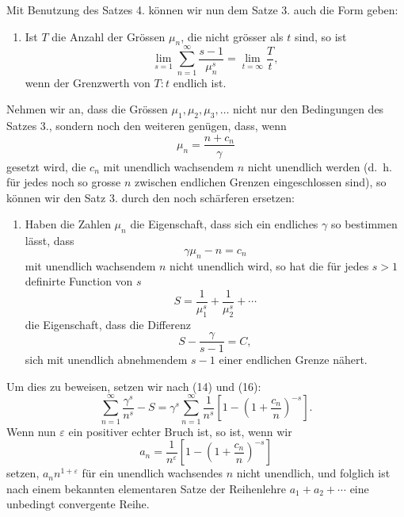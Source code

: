 \documentclass[11pt]{article}
\begin{document}
Mit Benutzung des Satzes 4. können wir nun dem Satze 3. auch die Form geben:

\begin{enumerate}[label=\textbf{\arabic*.},leftmargin=2.2em,start=5]
\item Ist $T$ die Anzahl der Grössen $\mu_n$, die nicht grösser als $t$ sind, so ist
\begin{equation}
\lim_{s=1}\sum_{n=1}^{\infty}\frac{s-1}{\mu_n^s}=\lim_{t=\infty}\frac{T}{t},
\tag{13}
\end{equation}
wenn der Grenzwerth von $T:t$ endlich ist.
\end{enumerate}

Nehmen wir an, dass die Grössen $\mu_1,\mu_2,\mu_3,\ldots$ nicht nur den Bedingungen des Satzes 3., sondern noch den weiteren genügen, dass, wenn
\begin{equation}
\mu_n=\frac{n+c_n}{\gamma}
\tag{14}
\end{equation}
gesetzt wird, die $c_n$ mit unendlich wachsendem $n$ nicht unendlich werden (d.\ h. für jedes noch so grosse $n$ zwischen endlichen Grenzen eingeschlossen sind), so können wir den Satz 3. durch den noch schärferen ersetzen:

\begin{enumerate}[label=\textbf{\arabic*.},leftmargin=2.2em,start=6]
\item Haben die Zahlen $\mu_n$ die Eigenschaft, dass sich ein endliches $\gamma$ so bestimmen lässt, dass
\begin{equation}
\gamma\mu_n-n=c_n
\tag{15}
\end{equation}
mit unendlich wachsendem $n$ nicht unendlich wird, so hat die für jedes $s>1$ definirte Function von $s$
\begin{equation}
S=\frac1{\mu_1^s}+\frac1{\mu_2^s}+\cdots
\tag{16}
\end{equation}
die Eigenschaft, dass die Differenz
\begin{equation}
S-\frac{\gamma}{s-1}=C,
\tag{17}
\end{equation}
sich mit unendlich abnehmendem $s-1$ einer endlichen Grenze nähert.
\end{enumerate}

Um dies zu beweisen, setzen wir nach (14) und (16):
\begin{equation}
\sum_{n=1}^{\infty}\frac{\gamma^s}{n^s}-S
=\gamma^s\sum_{n=1}^{\infty}\frac1{n^s}
\left[1-\left(1+\frac{c_n}{n}\right)^{-s}\right].
\tag{18}
\end{equation}
Wenn nun $\varepsilon$ ein positiver echter Bruch ist, so ist, wenn wir
\[
a_n=\frac1{n^\varepsilon}\left[1-\left(1+\frac{c_n}{n}\right)^{-s}\right]
\]
setzen, $a_n n^{1+\varepsilon}$ für ein unendlich wachsendes $n$ nicht unendlich, und folglich ist nach einem bekannten elementaren Satze der Reihenlehre $a_1+a_2+\cdots$ eine unbedingt convergente Reihe.
\end{document}
